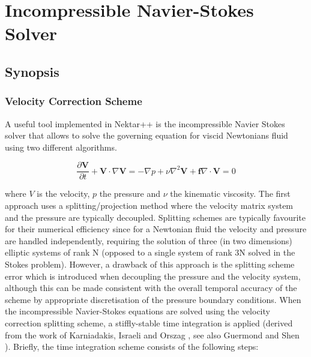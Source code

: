 \chapter{Incompressible Navier-Stokes Solver}
\label{IncNSsolver}

\section{Synopsis}
\subsection{Velocity Correction Scheme}
\label{VCSscheme}
A useful tool implemented in Nektar++ is the incompressible Navier
Stokes solver that allows to solve the governing equation for viscid
Newtonians fluid using two different algorithms.

\begin{subequations}
\begin{equation}
   \frac{\partial \mathbf{V}}{\partial t} + \mathbf{V} \cdot \nabla \mathbf{V} = -\nabla p + \nu \nabla^2 \mathbf{V} +  \mathbf{f}
 \end{equation}

 \begin{equation}
    \nabla \cdot \mathbf{V} = 0
    \end{equation}
 \end{subequations}

where $V$ is the velocity, $p$ the pressure and $\nu$ the kinematic
viscosity. The first approach uses a splitting/projection method where
the velocity matrix system and the pressure are typically
decoupled. Splitting schemes are typically favourite for their
numerical efficiency since for a Newtonian fluid the velocity and
pressure are handled independently, requiring the solution of three
(in two dimensions) elliptic systems of rank N (opposed to a single
system of rank 3N solved in the Stokes problem). However, a drawback
of this approach is the splitting scheme error which is introduced
when decoupling the pressure and the velocity system, although this
can be made consistent with the overall temporal accuracy of the
scheme by appropriate discretisation of the pressure boundary
conditions. When the incompressible Navier-Stokes equations are solved
using the velocity correction splitting scheme, a stiffly-stable time
integration is applied (derived from the work of Karniadakis, Israeli
and Orszag \cite{KaIsOr91}, see also Guermond and Shen \cite{GuSh03}).
Briefly, the time integration scheme consists of the following
steps:\\

